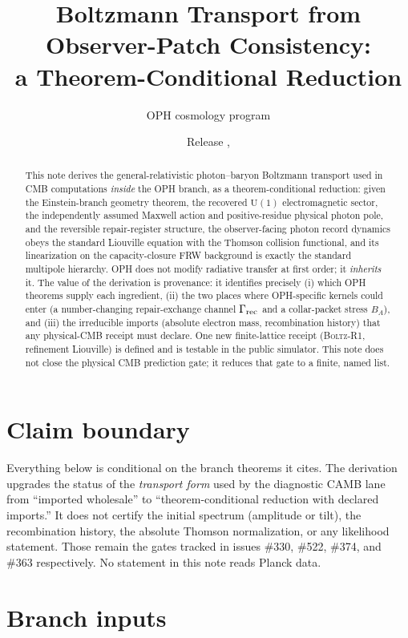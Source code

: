 \documentclass[11pt]{article}
\title{Boltzmann Transport from Observer-Patch Consistency:\\
a Theorem-Conditional Reduction}
\author{OPH cosmology program}
\date{Release \texttt{\OPHPaperReleaseID}, \OPHPaperReleaseDate}
\theoremstyle{remark}
\begin{document}
\maketitle

\begin{abstract}
This note derives the general-relativistic photon--baryon Boltzmann transport
used in CMB computations \emph{inside} the OPH branch, as a theorem-conditional
reduction: given the Einstein-branch geometry theorem, the recovered
$\mathrm U(1)$ electromagnetic sector, the independently assumed Maxwell action
and positive-residue physical photon pole, and the reversible repair-register
structure, the observer-facing photon record dynamics obeys the standard
Liouville equation with the Thomson collision functional, and its linearization
on the capacity-closure FRW background is exactly the standard multipole
hierarchy. OPH does not modify radiative transfer at first order; it
\emph{inherits} it. The value of the derivation is provenance: it identifies
precisely (i) which OPH theorems supply each ingredient, (ii) the two places
where OPH-specific kernels could enter (a number-changing repair-exchange
channel $\Gamma_{\rm rec}$ and a collar-packet stress $B_A$), and (iii) the
irreducible imports (absolute electron mass, recombination history) that any
physical-CMB receipt must declare. One new finite-lattice receipt
(\textsc{Boltz-R1}, refinement Liouville) is defined and is testable in the
public simulator. This note does not close the physical CMB prediction gate;
it reduces that gate to a finite, named list.
\end{abstract}

\section{Claim boundary}
Everything below is conditional on the branch theorems it cites. The
derivation upgrades the status of the \emph{transport form} used by the
diagnostic CAMB lane from ``imported wholesale'' to ``theorem-conditional
reduction with declared imports.'' It does not certify the initial spectrum
(amplitude or tilt), the recombination history, the absolute Thomson
normalization, or any likelihood statement. Those remain the gates tracked in
issues \#330, \#522, \#374, and \#363 respectively. No statement in this note
reads Planck data.

\section{Branch inputs}
\end{document}
